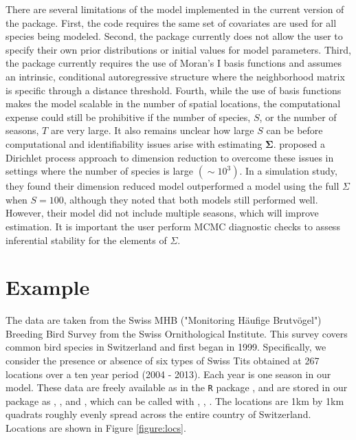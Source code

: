 There are several limitations of the model implemented in the current version of the  package. First, the code requires the same set of covariates are used for all species being modeled. Second, the package currently does not allow the user to specify their own prior distributions or initial values for model parameters. Third, the package currently requires the use of Moran's I basis functions and assumes an intrinsic, conditional autoregressive structure where the neighborhood matrix is specific through a distance threshold. Fourth, while the use of basis functions makes the model scalable in the number of spatial locations, the computational expense could still be prohibitive if the number of species, $S$, or the number of seasons, $T$ are very large. It also remains unclear how large $S$ can be before computational and identifiability issues arise with estimating $\boldsymbol{\Sigma}$. \cite{taylor2017joint} proposed a Dirichlet process approach to dimension reduction to overcome these issues in settings where the number of species is large $(\sim 10^3)$. In a simulation study, they found their dimension reduced model outperformed a model using the full $\Sigma$ when $S=100$, although they noted that both models still performed well. However, their model did not include multiple seasons, which will improve estimation. It is important the user perform MCMC diagnostic checks to assess inferential stability for the elements of $\Sigma$.

\section{Example}
The data are taken from the Swiss MHB ("Monitoring Häufige Brutvögel") Breeding Bird Survey from the Swiss Ornithological Institute.  This survey covers common bird species in Switzerland and first began in 1999.  Specifically, we consider the presence or absence of six types of Swiss Tits obtained at 267 locations over a ten year period (2004 - 2013).  Each year is one season in our model. These data are freely available as  in the \texttt{R} package   \citep{kery2017ahmbook}, and are stored in our package  as , , and , which can be called with , , .  The locations  are 1km by 1km quadrats roughly evenly spread across the entire country of Switzerland.   Locations are shown in Figure \ref{figure:locs}.

